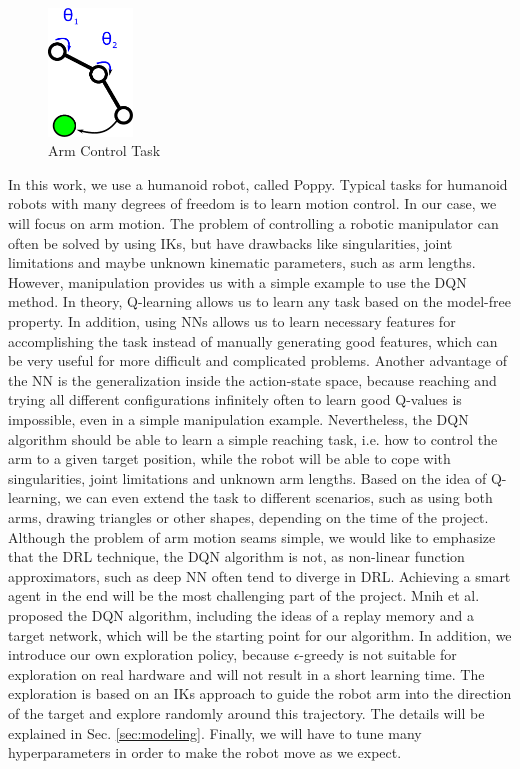 \documentclass[a4paper,twoside, openright,12pt]{report}
\begin{document}
\begin{figure}[H]
	\centering
	\includegraphics[width=0.2\textwidth]{reportpics/task.eps}
	\caption{Arm Control Task}
	\label{fig:task}
\end{figure}

In this work, we use a humanoid robot, called Poppy. Typical tasks for humanoid robots with many degrees of freedom is to learn motion control. In our case, we will focus on arm motion. The problem of controlling a robotic manipulator can often be solved by using \acp{IK}, but have drawbacks like singularities, joint limitations and maybe unknown kinematic parameters, such as arm lengths. However, manipulation provides us with a simple example to use the \ac{DQN} method. In theory, Q-learning allows us to learn any task based on the model-free property. In addition, using \acp{NN} allows us to learn necessary features for accomplishing the task instead of manually generating good features, which can be very useful for more difficult and complicated problems. Another advantage of the \ac{NN} is the generalization inside the action-state space, because reaching and trying all different configurations infinitely often to learn good Q-values is impossible, even in a simple manipulation example. Nevertheless, the \ac{DQN} algorithm should be able to learn a simple reaching task, i.e. how to control the arm to a given target position, while the robot will be able to cope with singularities, joint limitations and unknown arm lengths. Based on the idea of Q-learning, we can even extend the task to different scenarios, such as using both arms, drawing triangles or other shapes, depending on the time of the project. Although the problem of arm motion seams simple, we would like to emphasize that the \ac{DRL} technique, the \ac{DQN} algorithm is not, as non-linear function approximators, such as deep \ac{NN} often tend to diverge in \ac{DRL}. Achieving a smart agent in the end will be the most challenging part of the project. Mnih et al.~\cite{mnih2015human} proposed the \ac{DQN} algorithm, including the ideas of a replay memory and a target network, which will be the starting point for our algorithm. In addition, we introduce our own exploration policy, because $\epsilon$-greedy is not suitable for exploration on real hardware and will not result in a short learning time. The exploration is based on an \acp{IK} approach to guide the robot arm into the direction of the target and explore randomly around this trajectory. The details will be explained in Sec. \ref{sec:modeling}. Finally, we will have to tune many hyperparameters in order to make the robot move as we expect.
\end{document}

